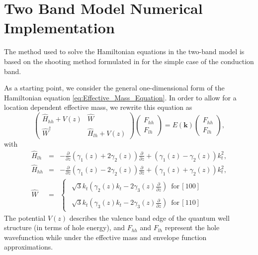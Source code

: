 
\chapter{Two Band Model Numerical Implementation}

\label{cha:Appendix_Two_Band_Numerics}The method used to solve the
Hamiltonian equations in the two-band model is based on the shooting
method formulated in \citealp{harrison_quantum_2000} for the simple
case of the conduction band.

As a starting point, we consider the general one-dimensional form
of the Hamiltonian equation \ref{eq:Effective_Mass_Equation}. In
order to allow for a location dependent effective mass, we rewrite
this equation as\begin{equation}
\left(\begin{array}{cc}
\hat{H}_{hh}+V(z) & \hat{W}\\
\hat{W}^{\dagger} & \hat{H}_{lh}+V(z)\end{array}\right)\left(\begin{array}{c}
F_{hh}\\
F_{lh}\end{array}\right)=E(\mathbf{k})\left(\begin{array}{c}
F_{hh}\\
F_{lh}\end{array}\right),\end{equation}
with \begin{eqnarray}
\hat{H}_{lh} & = & -\frac{\partial}{\partial z}\left(\gamma_{1}(z)+2\gamma_{2}(z)\right)\frac{\partial}{\partial z}+\left(\gamma_{1}(z)-\gamma_{2}(z)\right)k_{t}^{2},\\
\hat{H}_{hh} & = & -\frac{\partial}{\partial z}\left(\gamma_{1}(z)-2\gamma_{2}(z)\right)\frac{\partial}{\partial z}+\left(\gamma_{1}(z)+\gamma_{2}(z)\right)k_{t}^{2},\\
\hat{W} & = & \left\{ \begin{array}{c}
\begin{array}{c}
\sqrt{3}k_{t}\left(\gamma_{2}(z)k_{t}-2\gamma_{3}(z)\frac{\partial}{\partial z}\right)\,\,\,\textrm{for}\,[100]\end{array}\\
\begin{array}{c}
\sqrt{3}k_{t}\left(\gamma_{3}(z)k_{t}-2\gamma_{3}(z)\frac{\partial}{\partial z}\right)\,\,\,\textrm{for}\,[110]\end{array}\end{array}\right.\end{eqnarray}
The potential $V(z)$ describes the valence band edge of the quantum
well structure (in terms of hole energy), and $F_{hh}$ and $F_{lh}$
represent the hole wavefunction while under the effective mass and
envelope function approximations.


